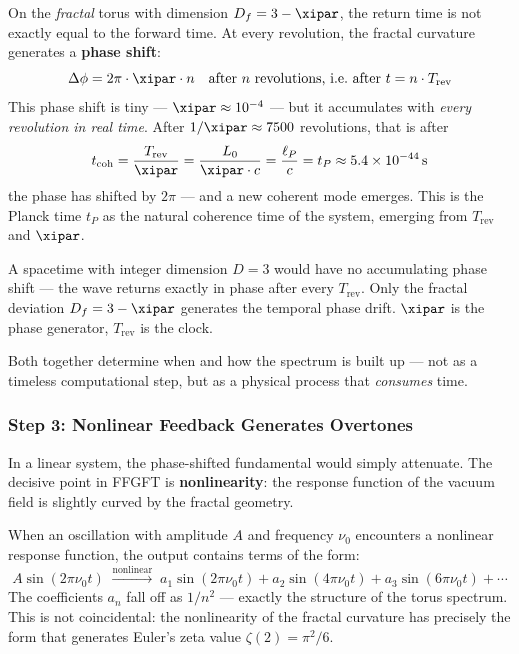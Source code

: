 On the \emph{fractal} torus with dimension $D_f = 3 - \xipar$, the return time
is not exactly equal to the forward time. At every revolution, the fractal
curvature generates a \textbf{phase shift}:
\begin{equation}
    \Delta\phi = 2\pi \cdot \xipar \cdot n
    \quad \text{after } n \text{ revolutions, i.e.\ after } t = n \cdot T_\text{rev}
\end{equation}
This phase shift is tiny — $\xipar \approx 10^{-4}$ — but it accumulates with
\emph{every revolution in real time}. After $1/\xipar \approx 7500$ revolutions,
that is after
\begin{equation}
    t_\text{coh} = \frac{T_\text{rev}}{\xipar} = \frac{L_0}{\xipar \cdot c}
    = \frac{\ell_P}{c} = t_P \approx 5.4 \times 10^{-44}\,\text{s}
\end{equation}
the phase has shifted by $2\pi$ — and a new coherent mode emerges.
This is the Planck time $t_P$ as the natural coherence time of the system,
emerging from $T_\text{rev}$ and $\xipar$.

\begin{technical}
A spacetime with integer dimension $D = 3$ would have no accumulating phase shift —
the wave returns exactly in phase after every $T_\text{rev}$. Only the fractal
deviation $D_f = 3 - \xipar$ generates the temporal phase drift. $\xipar$ is the
phase generator, $T_\text{rev}$ is the clock.

Both together determine when and how the spectrum is built up — not as a timeless
computational step, but as a physical process that \emph{consumes} time.
\end{technical}

\subsubsection*{Step 3: Nonlinear Feedback Generates Overtones}

In a linear system, the phase-shifted fundamental would simply attenuate.
The decisive point in FFGFT is \textbf{nonlinearity}: the response function of the
vacuum field is slightly curved by the fractal geometry.

When an oscillation with amplitude $A$ and frequency $\nu_0$ encounters a
nonlinear response function, the output contains terms of the form:
\begin{equation}
    A \sin(2\pi \nu_0 t) \;\xrightarrow{\text{nonlinear}}\;
    a_1 \sin(2\pi \nu_0 t) + a_2 \sin(4\pi \nu_0 t) + a_3 \sin(6\pi \nu_0 t) + \cdots
\end{equation}
The coefficients $a_n$ fall off as $1/n^2$ — exactly the structure of the torus
spectrum. This is not coincidental: the nonlinearity of the fractal curvature has
precisely the form that generates Euler's zeta value $\zeta(2) = \pi^2/6$.

